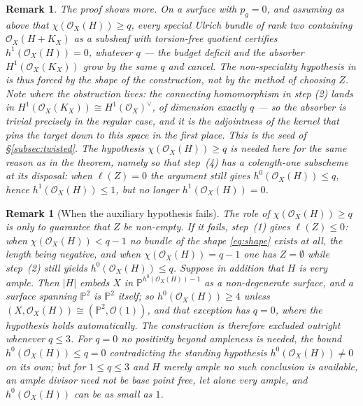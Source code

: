 \documentclass[10pt,a4paper]{amsart}
\newtheorem{remark}[theorem]{Remark}
\newcommand{\OO}{\mathcal{O}}
\newcommand{\PP}{\mathbb{P}}
\newcommand{\len}{\ell}
\begin{document}
\begin{remark}\label{rem:nogo-more}
The proof shows more. On a surface with $p_g=0$, and assuming as above that $\chi(\OO_X(H))\ge q$, \emph{every} special Ulrich bundle of rank two containing $\OO_X(H+K_X)$ as a subsheaf with torsion-free quotient certifies $h^1(\OO_X(H))=0$, whatever $q$ --- the budget deficit and the absorber $H^1(\OO_X(K_X))$ grow by the same $q$ and cancel. The non-speciality hypothesis in \cite{Bea16b,Cas17,Cas22} is thus forced by the shape of the construction, not by the method of choosing $Z$. Note where the obstruction lives: the connecting homomorphism in step (2) lands in $H^1(\OO_X(K_X))\cong H^1(\OO_X)^\vee$, of dimension exactly $q$ --- so the absorber is trivial precisely in the regular case, and it is the adjointness of the kernel that pins the target down to this space in the first place. This is the seed of \S\ref{subsec:twisted}. The hypothesis $\chi(\OO_X(H))\ge q$ is needed here for the same reason as in the theorem, namely so that step~(4) has a colength-one subscheme at its disposal: when $\len(Z)=0$ the argument still gives $h^0(\OO_X(H))\le q$, hence $h^1(\OO_X(H))\le1$, but no longer $h^1(\OO_X(H))=0$.
\end{remark}

\begin{remark}[When the auxiliary hypothesis fails]\label{rem:nogo-vacuous}
The role of $\chi(\OO_X(H))\ge q$ is only to guarantee that $Z$ be non-empty. If it fails, step~(1) gives $\len(Z)\le0$: when $\chi(\OO_X(H))<q-1$ no bundle of the shape \eqref{eq:shape} exists at all, the length being negative, and when $\chi(\OO_X(H))=q-1$ one has $Z=\emptyset$ while step~(2) still yields $h^0(\OO_X(H))\le q$. Suppose in addition that $H$ is very ample. Then $|H|$ embeds $X$ in $\PP^{h^0(\OO_X(H))-1}$ as a non-degenerate surface, and a surface spanning $\PP^2$ is $\PP^2$ itself; so $h^0(\OO_X(H))\ge4$ unless $(X,\OO_X(H))\cong(\PP^2,\OO(1))$, and that exception has $q=0$, where the hypothesis holds automatically. The construction is therefore excluded outright whenever $q\le3$. For $q=0$ no positivity beyond ampleness is needed, the bound $h^0(\OO_X(H))\le q=0$ contradicting the standing hypothesis $h^0(\OO_X(H))\neq0$ on its own; but for $1\le q\le3$ and $H$ merely ample no such conclusion is available, an ample divisor need not be base point free, let alone very ample, and $h^0(\OO_X(H))$ can be as small as $1$.
\end{remark}
\end{document}
